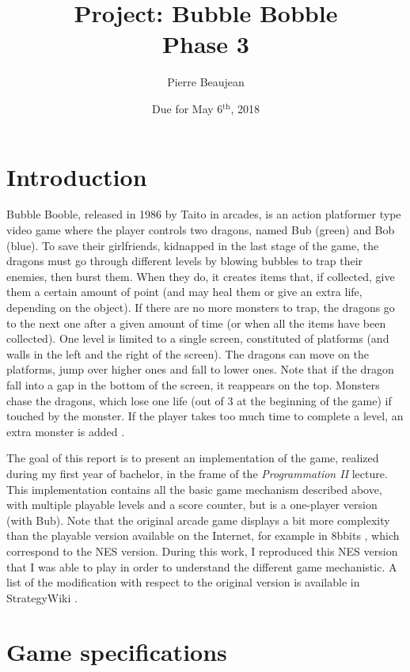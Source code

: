 \documentclass[12pt,a4paper]{article}
\title{Project: Bubble Bobble\\Phase 3}
\author{Pierre Beaujean}
\date{Due for May 6$^\text{th}$, 2018}
\begin{document}
\maketitle

\section{Introduction}

Bubble Booble, released in 1986 by Taito in arcades, is an action platformer type video game where the player controls two dragons, named Bub (green) and Bob (blue). To save their girlfriends, kidnapped in the last stage of the game, the dragons must go through different levels by blowing bubbles to trap their enemies, then burst them. When they do, it creates items that, if collected, give them a certain amount of point (and may heal them or give an extra life, depending on the object). If there are no more monsters to trap, the dragons go to the next one after a given amount of time (or when all the items have been collected). One level is limited to a single screen, constituted of platforms (and walls in the left and the right of the screen). The dragons can move on the platforms, jump over higher ones and fall to lower ones. Note that if the dragon fall into a gap in the bottom of the screen, it reappears on the top. Monsters chase the dragons, which lose one life (out of 3 at the beginning of the game) if touched by the monster. If the player takes too much time to complete a level, an extra monster is added \cite{wikibub,wikibub2}.

The goal of this report is to present an implementation of the game, realized during my first year of bachelor, in the frame of the \textit{Programmation II} lecture. This implementation contains all the basic game mechanism described above, with multiple playable levels and a score counter, but is a one-player version (with Bub).
Note that the original arcade game displays a bit more complexity than the playable version available on the Internet, for example in 8bbits \cite{playbub}, which correspond to the NES version. During this work, I reproduced this NES version that I was able to play in order to understand the different game mechanistic. A list of the modification with respect to the original version is available in StrategyWiki \cite{wikibub2_nes}.



\section{Game specifications}
\end{document}
